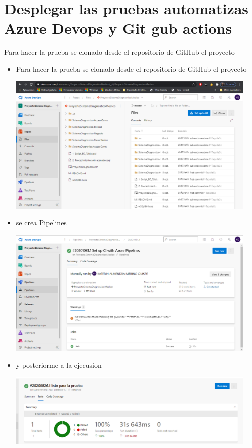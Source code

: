 \documentclass[preprint,12pt]{elsarticle}
\begin{document}
\section{Desplegar las pruebas automatizas  Azure Devops y Git gub actions }
Para hacer la prueba se clonado desde el repositorio de GitHub el proyecto
\begin{itemize} 
    \item Para hacer la prueba se clonado desde el repositorio de GitHub el proyecto
	\begin{center}
	\includegraphics[width=12cm]{./imagen/20} 
	\end{center}
	\item se crea Pipelines
	\begin{center}
	\includegraphics[width=12cm]{./imagen/21} 
	\end{center}
	\item y posteriorme a la ejecusion
	\begin{center}
	\includegraphics[width=12cm]{./imagen/22} 
	\end{center}
\end{itemize}
	\newpage
\end{document}
